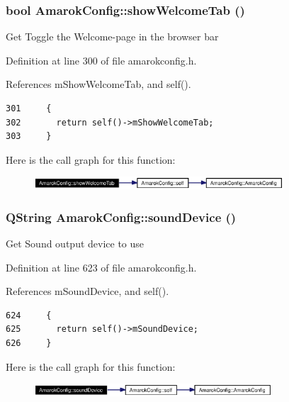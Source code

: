 \subsubsection{\setlength{\rightskip}{0pt plus 5cm}bool Amarok\-Config::show\-Welcome\-Tab ()\hspace{0.3cm}{\tt  [inline, static]}}\label{classAmarokConfig_AmarokConfige30}


Get Toggle the Welcome-page in the browser bar 

Definition at line 300 of file amarokconfig.h.

References m\-Show\-Welcome\-Tab, and self().



\footnotesize\begin{verbatim}301     {
302       return self()->mShowWelcomeTab;
303     }
\end{verbatim}\normalsize 


Here is the call graph for this function:\begin{figure}[H]
\begin{center}
\leavevmode
\includegraphics[width=264pt]{classAmarokConfig_AmarokConfige30_cgraph}
\end{center}
\end{figure}
\subsubsection{\setlength{\rightskip}{0pt plus 5cm}QString Amarok\-Config::sound\-Device ()\hspace{0.3cm}{\tt  [inline, static]}}\label{classAmarokConfig_AmarokConfige64}


Get Sound output device to use 

Definition at line 623 of file amarokconfig.h.

References m\-Sound\-Device, and self().



\footnotesize\begin{verbatim}624     {
625       return self()->mSoundDevice;
626     }
\end{verbatim}\normalsize 


Here is the call graph for this function:\begin{figure}[H]
\begin{center}
\leavevmode
\includegraphics[width=252pt]{classAmarokConfig_AmarokConfige64_cgraph}
\end{center}
\end{figure}

